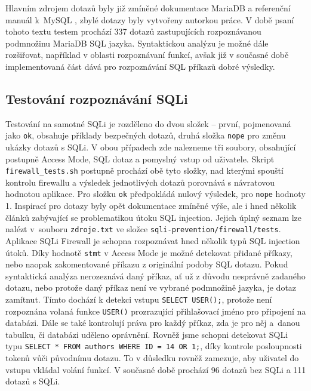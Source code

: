 Hlavním zdrojem dotazů byly již zmíněné dokumentace MariaDB \cite{MariaDB} a referenční manuál k~MySQL \cite{MySQL}, zbylé dotazy byly vytvořeny
autorkou práce. V době psaní tohoto textu testem prochází 337 dotazů zastupujících rozpoznávanou podmnožinu MariaDB SQL jazyka. Syntaktickou
analýzu je možné dále rozšiřovat, například v oblasti rozpoznávaní funkcí, avšak již v současné době implementovaná část dává pro rozpoznávání 
SQL příkazů dobré výsledky.

\subsection{Testování rozpoznávání SQLi}
Testování na samotné SQLi je rozděleno do dvou složek -- první, pojmenovaná jako \texttt{ok}, obsahuje příklady bezpečných dotazů, druhá složka 
\texttt{nope} pro změnu ukázky dotazů s SQLi. V obou případech zde nalezneme tři soubory, obsahující postupně Access Mode, SQL dotaz a pomyslný vstup 
od uživatele. Skript \texttt{firewall\_tests.sh} postupně prochází obě tyto složky, nad kterými spouští kontrolu firewallu a výsledek jednotlivých 
dotazů porovnává s návratovou hodnotou aplikace. Pro složku \texttt{ok} předpokládá nulový výsledek, pro \texttt{nope} hodnoty 1. Inspirací pro 
dotazy byly opět dokumentace zmíněné výše, ale i hned několik článků zabývající se problematikou útoku SQL injection. Jejich úplný seznam lze nalézt 
v~souboru \texttt{zdroje.txt} ve složce \texttt{sqli-prevention/firewall/tests}. \\

Aplikace SQLi Firewall je schopna rozpoznávat hned několik typů SQL injection útoků. Díky hodnotě \texttt{stmt} v Access Mode je možné
detekovat přidané příkazy, nebo naopak zakomentované příkazu z originální podoby SQL dotazu. Pokud syntaktická analýza nerozeznává daný
příkaz, ať už z důvodu nesprávně zadaného dotazu, nebo protože daný příkaz není ve vybrané podmnožině jazyka, je dotaz zamítnut.
Tímto dochází k detekci vstupu \texttt{SELECT USER();}, protože není rozpoznána volaná funkce \texttt{USER()} prozrazující přihlašovací jméno
pro připojení na databázi. Dále se také kontrolují práva pro každý příkaz, zda je pro něj a~danou tabulku, či databázi uděleno oprávnění.
Rovněž jsme schopni detekovat SQLi typu \texttt{SELECT * FROM authors WHERE ID = 14 OR 1;}, díky kontrole posloupnosti tokenů vůči
původnímu dotazu. To v důsledku rovněž zamezuje, aby uživatel do vstupu vkládal volání funkcí. V současné době prochází 96 dotazů
bez SQLi a 111 dotazů s SQLi.

